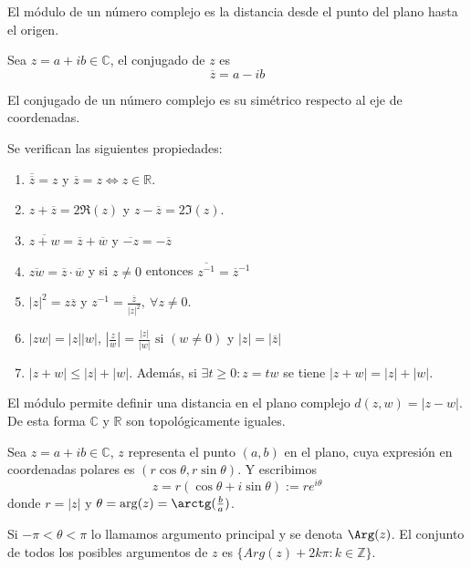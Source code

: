 \begin{obs}
  El módulo de un número complejo es la distancia desde el punto del plano hasta el origen.
\end{obs}

\begin{defn}[Conjugado]
  Sea $ z=a +ib \in \mathbb{C} $, el conjugado de $z$ es \[ \overline{z}=a-ib \] 
\end{defn}

\begin{obs}
  El conjugado de un número complejo es su simétrico respecto al eje de coordenadas.
\end{obs}

\begin{prop}
  Se verifican las siguientes propiedades:
  \begin{enumerate}[label=(\roman*)]
    \item $\overline{\overline{z}}=z$ y $\overline{z} = z \Leftrightarrow z \in \mathbb{R}$.
    \item $ z + \overline{z} = 2\Re(z)$ y $z - \overline{z} = 2 \Im(z)$.
    \item $ \overline{z+w}= \overline{z} + \overline{w}$ y $ \overline{-z} = -\overline{z}$
    \item $\overline{zw} = \overline{z} \cdot \overline{w}$ y si $z \neq 0$ entonces $\overline{z^{-1}} = \overline{z}^{-1}$
    \item $|z|^{2} = z \overline{z}$ y $z^{-1} = \frac{\overline{z}}{|z|^{2}},\ \forall z \neq 0.$
    \item $|zw| = |z||w|$, $|\frac{z}{w}|= \frac{|z|}{|w|} \text{ si $(w \neq 0)$}$ y $|z| = |\overline{z}|$
    \item $|z + w| \leq |z| + |w|$. Además, si $\exists t \geq 0 : z=tw$ se tiene $|z+w| = |z| + |w|$.
  \end{enumerate}
\end{prop}

\begin{obs}
  El módulo permite definir una distancia en el plano complejo $ d(z,w) = |z - w|$. De esta forma $\mathbb{C}$ y $\mathbb{R}$ son topológicamente iguales.
\end{obs}

\begin{defn}
Sea $z = a + ib \in \mathbb{C}$, $z$ representa el punto $(a, b)$ en el plano, cuya expresión en coordenadas polares es $(r\cos\theta, r\sin \theta)$. Y escribimos \[z = r(\cos \theta + i \sin \theta) := re^{i \theta}\] donde $r=|z|$ y $\theta = \arg(z) = \arctg(\frac{b}{a})$.
\end{defn}

\begin{obs}
  Si $-\pi < \theta < \pi$ lo llamamos argumento principal y se denota $\Arg(z)$. El conjunto de todos los posibles argumentos de $z$ es $\{ Arg(z) + 2k\pi : k \in  \mathbb{Z}\}$.
\end{obs}

